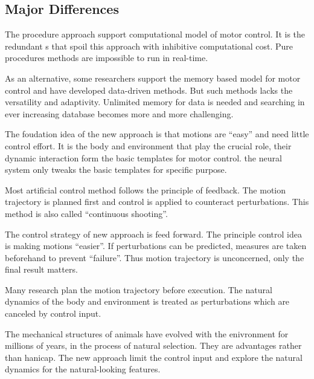 \subsection{Major Differences}
\begin{itemize}
The procedure approach support computational model of motor control.
It is the redundant {\dof}s that spoil this approach  with inhibitive computational cost.
Pure procedures methods are impossible to run in real-time.

As an alternative, some researchers support the memory based model for motor control and have developed data-driven methods.
But such methods lacks the versatility and adaptivity.
Unlimited memory for data is needed and searching in ever increasing database becomes more and more challenging.

The foudation idea of the new approach is that motions are ``easy'' and need little control effort.
It is the body and environment that play the crucial role, their dynamic interaction form the basic templates for motor control.
the neural system only tweaks the basic templates for specific purpose.



 
 
	
Most artificial control method follows the principle of feedback.
The motion trajectory is planned first and control is applied to counteract perturbations.
This method is also called ``continuous shooting''.


The control strategy of new approach is feed forward.
The principle control idea is making motions ``easier''.
If perturbations can be predicted, measures are taken beforehand to prevent ``failure''.
Thus motion trajectory is unconcerned, only the final result matters.


Many \cms research plan the motion trajectory before execution.
The natural dynamics of the body and environment is treated as perturbations which are canceled by control input.


The mechanical structures of animals have evolved with the enivronment for millions of years, in the process of natural selection.
They are advantages rather than hanicap. 
The new approach limit the control input and explore the natural dynamics for the natural-looking features.
\end{itemize}


